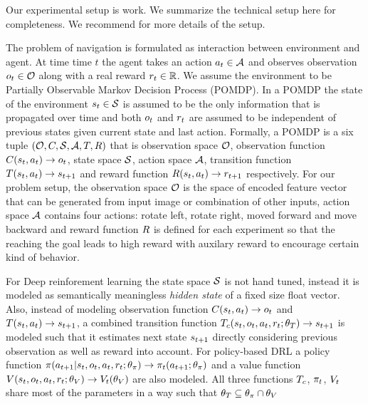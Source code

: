 Our experimental setup is \cite{MiPaViICLR2017} work. We summarize the technical setup here for completeness. We recommend \cite{MnBaMiICML2016,MiPaViICLR2017} for more details of the setup.

The problem of navigation is formulated as interaction between environment and agent. At time time $t$ the agent takes an action $a_t \in \mathcal{A}$ and observes observation $o_t \in \mathcal{O}$ along with a real reward $r_t \in \mathbb{R}$.
We assume the environment to be Partially Observable Markov Decision Process (POMDP).
In a POMDP the state of the environment $s_t \in \mathcal{S}$ is assumed to be the only information that is propagated over time and both $o_t$ and $r_t$ are assumed to be independent of previous states given current state and last action. Formally, a POMDP is a six tuple $(\mathcal{O}, C, \mathcal{S}, \mathcal{A}, T, R)$ that is observation space $\mathcal{O}$, observation function $C(s_t, a_t) \rightarrow o_t$, state space $\mathcal{S}$, action space $\mathcal{A}$, transition function $T(s_t, a_t) \rightarrow s_{t+1}$ and reward function $R(s_t, a_t) \rightarrow r_{t+1}$ respectively.
For our problem setup, the observation space $\mathcal{O}$ is the space of encoded feature vector that can be generated from input image or combination of other inputs, action space $\mathcal{A}$ contains four actions: rotate left, rotate right, moved forward and move backward and reward function $R$ is defined for each experiment so that the reaching the goal leads to high reward with auxilary reward to encourage certain kind of behavior.

For Deep reinforement learning the state space $\mathcal{S}$ is not hand tuned, instead it is modeled as semantically meaningless \emph{hidden state} of a fixed size float vector.
Also, instead of modeling observation function $C(s_t, a_t) \rightarrow o_t$ and $T(s_t, a_t) \rightarrow s_{t+1}$, a combined transition function $T_c(s_t, o_t, a_t, r_t; \theta_T) \rightarrow s_{t+1}$ is modeled such that it estimates next state $s_{t+1}$ directly considering previous observation as well as reward into account. For policy-based DRL a policy function $\pi(a_{t+1}|s_t, o_t, a_t, r_t; \theta_\pi) \rightarrow \pi_t(a_{t+1} ; \theta_\pi)$ and a value function $V(s_t, o_t, a_t, r_t; \theta_V) \rightarrow V_t(\theta_V)$ are also modeled. All three functions $T_c$, $\pi_t$, $V_t$ share most of the parameters in a way such that $\theta_T \subseteq \theta_{\pi} \cap \theta_V$

